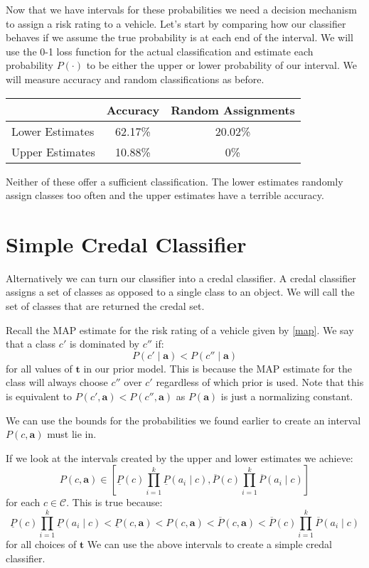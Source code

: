 Now that we have intervals for these probabilities we need a decision mechanism to assign a risk rating to a vehicle.
Let's start by comparing how our classifier behaves if we assume the true probability is at each end of the interval.
We will use the 0-1 loss function for the actual classification and estimate each probability $P(\cdot)$ to be either the upper or lower probability of our interval.
We will measure accuracy and random classifications as before.

\begin{center}
	\begin{tabular}{l|c c}
	                & Accuracy & Random Assignments \\
	\hline
	Lower Estimates & 62.17\%  & 20.02\%            \\
	Upper Estimates & 10.88\%  & 0\%                \\
	\end{tabular}
\end{center}

Neither of these offer a sufficient classification.
The lower estimates randomly assign classes too often and the upper estimates have a terrible accuracy.

\section{Simple Credal Classifier}
Alternatively we can turn our classifier into a credal classifier.
A credal classifier assigns a set of classes as opposed to a single class to an object.
We will call the set of classes that are returned the credal set.

Recall the MAP estimate for the risk rating of a vehicle given by \cref{map}.
We say that a class $c'$ is dominated by $c''$ if:
\begin{equation}\label{Credal Dominance}
P(c' \mid \mathbf{a}) < P(c'' \mid \mathbf{a})
\end{equation}
for all values of $\mathbf{t}$ in our prior model.
This is because the MAP estimate for the class will always choose $c''$ over $c'$ regardless of which prior is used.
Note that this is equivalent to $P(c', \mathbf{a}) < P(c'', \mathbf{a})$ as $P(\mathbf{a})$ is just a normalizing constant.

We can use the bounds for the probabilities we found earlier to create an interval $P(c, \mathbf{a})$ must lie in. 

If we look at the intervals created by the upper and lower estimates we achieve:
\begin{equation}
	P(c, \mathbf{a}) \in \left[ \underline{P}(c)\prod_{i=1}^k \underline{P}(a_i \mid c), \overline{P}(c)\prod_{i=1}^k \overline{P}(a_i \mid c) \right]
\end{equation}
for each $c \in \mathcal{C}$.
This is true because:
\begin{equation}
\underline{P}(c)\prod_{i=1}^k \underline{P}(a_i \mid c) < \underline{P}(c, \mathbf{a}) < P(c, \mathbf{a}) < \overline{P}(c, \mathbf{a}) < \overline{P}(c)\prod_{i=1}^k \overline{P}(a_i \mid c)
\end{equation}
for all choices of $\mathbf{t}$
We can use the above intervals to create a simple credal classifier.

